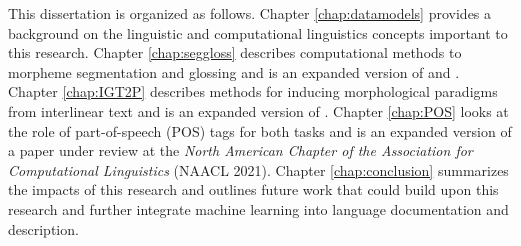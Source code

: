 




This dissertation is organized as follows. Chapter \ref{chap:datamodels} provides a background on the linguistic and computational linguistics concepts important to this research.
Chapter \ref{chap:seggloss} describes computational methods to morpheme segmentation and glossing and is an expanded version of \citet{moeller_automatic_2018} and \citet{moeller_integrating_2021}. Chapter \ref{chap:IGT2P} describes methods for inducing morphological paradigms from interlinear text and is an expanded version of \citet{moeller_igt2p_2020}. Chapter \ref{chap:POS} looks at the role of part-of-speech (POS) tags for both tasks and is an expanded version of a paper under review at the \textit{North American Chapter of the Association for Computational Linguistics} (NAACL 2021). Chapter \ref{chap:conclusion} summarizes the impacts of this research and outlines future work that could build upon this research and further integrate machine learning into language documentation and description.